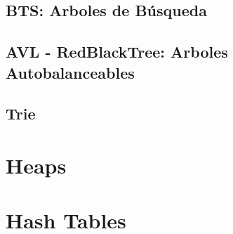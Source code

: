 \documentclass[12pt, fleqn]{report}                             %
\theoremstyle{break}                                            %
\begin{document}
        \section{BTS: Arboles de Búsqueda}

        \section{AVL - RedBlackTree: Arboles Autobalanceables}

        \section{Trie}

    \clearpage
    \chapter{Heaps}


    \clearpage
    \chapter{Hash Tables}


\end{document}
